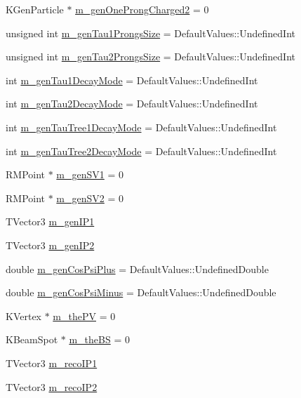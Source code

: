 \begin{DoxyCompactItemize}
\item 
KGenParticle $\ast$ \hyperlink{classHttProduct_a3cad468b45916675c7d3b551d3deb421}{m\_\-genOneProngCharged2} = 0
\item 
unsigned int \hyperlink{classHttProduct_abb0ed1f2a021227a3f5730fb133dc293}{m\_\-genTau1ProngsSize} = DefaultValues::UndefinedInt
\item 
unsigned int \hyperlink{classHttProduct_a48cfa5c2f5cf0b2909858ac0dfc3badc}{m\_\-genTau2ProngsSize} = DefaultValues::UndefinedInt
\item 
int \hyperlink{classHttProduct_a55c67bddc9cd45d950cbc943a63f4632}{m\_\-genTau1DecayMode} = DefaultValues::UndefinedInt
\item 
int \hyperlink{classHttProduct_a92b05122d3b7e10810649fb55b51d7cc}{m\_\-genTau2DecayMode} = DefaultValues::UndefinedInt
\item 
int \hyperlink{classHttProduct_af53a9d1e5cee3afcb40adc1640836c4d}{m\_\-genTauTree1DecayMode} = DefaultValues::UndefinedInt
\item 
int \hyperlink{classHttProduct_a97d011daac22c9d02478a6b11e660193}{m\_\-genTauTree2DecayMode} = DefaultValues::UndefinedInt
\item 
RMPoint $\ast$ \hyperlink{classHttProduct_ae3617dc56d9ef3bb87dacb354286f3fb}{m\_\-genSV1} = 0
\item 
RMPoint $\ast$ \hyperlink{classHttProduct_a519090c41ad7a95fde740478e4a0717f}{m\_\-genSV2} = 0
\item 
TVector3 \hyperlink{classHttProduct_ade104eec9f075c87d0de6c816e5fd260}{m\_\-genIP1}
\item 
TVector3 \hyperlink{classHttProduct_afa86c42d8eb6accbfa740e341c837fc1}{m\_\-genIP2}
\item 
double \hyperlink{classHttProduct_ac16132a7c669ebff09cb300be554a4c8}{m\_\-genCosPsiPlus} = DefaultValues::UndefinedDouble
\item 
double \hyperlink{classHttProduct_a8c5dc87b3c1234c92106729e42bc49d0}{m\_\-genCosPsiMinus} = DefaultValues::UndefinedDouble
\item 
KVertex $\ast$ \hyperlink{classHttProduct_ad59601b3ebee99a873ca371e79cbd1c4}{m\_\-thePV} = 0
\item 
KBeamSpot $\ast$ \hyperlink{classHttProduct_a21bfcdace50cb23137eb9cd1c6de4f0a}{m\_\-theBS} = 0
\item 
TVector3 \hyperlink{classHttProduct_a571feb2272c3205b12c0bd6e694127d3}{m\_\-recoIP1}
\item 
TVector3 \hyperlink{classHttProduct_afd8ea5060d1649bdc05b7598a43d3f30}{m\_\-recoIP2}

\end{DoxyCompactItemize}
